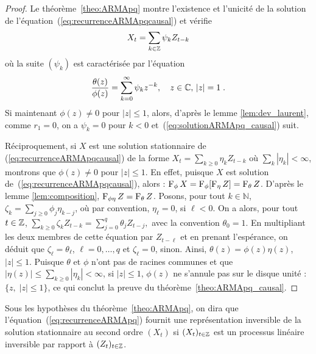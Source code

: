 \begin{proof}\smartqed
Le th\'eor\`eme~\ref{theo:ARMApq} montre l'existence et l'unicit\'e
de la solution de l'\'equation~(\ref{eq:recurrenceARMApqcausal}) et v\'erifie
\begin{equation*}
  X_t = \sum_{k\in\mathbb{Z}} \psi_k Z_{t-k}
\end{equation*}
o\`u la suite $(\psi_k)$ est caract\'eris\'ee par l'\'equation
$$
\frac{\theta(z)}{\phi(z)}=\sum_{k=0}^{\infty} \psi_k z^{-k},\quad z\in\mathbb{C},\,|z|=1\;.
$$
Si maintenant $\phi(z)\neq 0$ pour $|z|\leq 1$, alors, d'apr\`es le
 lemme \ref{lem:dev_laurent}, comme $r_1=0$, on a $\psi_k=0$ pour $k<0$
 et~(\ref{eq:solutionARMApq_causal}) suit.


R\'eciproquement, si $X$ est une solution stationnaire de
(\ref{eq:recurrenceARMApqcausal}) de la forme $X_t=\sum_{k\geq 0}\eta_k
Z_{t-k}$ o\`u $\sum_k |\eta_k|<\infty$, montrons que $\phi(z)\neq 0$ pour
$|z|\leq 1$. En effet, puisque $X$ est solution
de~(\ref{eq:recurrenceARMApqcausal}), alors : $\operatorname{F}_{\phi}
X=\operatorname{F}_{\phi}[\operatorname{F}_{\eta} Z]=\operatorname{F}_{\theta} Z$. D'apr\`es le lemme
\ref{lem:composition}, $\operatorname{F}_{\phi\eta}Z=\operatorname{F}_{\theta} Z$. Posons, pour
tout $k\in\mathbb{N}$, $\zeta_k=\sum_{j\geq 0}\phi_j \eta_{k-j}$, o\`u par
convention, $\eta_\ell=0$, si $\ell<0$.  On a alors, pour tout $t\in\mathbb{Z}$,
$\sum_{k\geq 0}\zeta_k Z_{t-k}=\sum_{j=0}^q\theta_j Z_{t-j},$ avec la
convention $\theta_0=1$.  En multipliant les deux membres de cette \'equation par
$Z_{t-\ell}$ et en prenant l'esp\'erance, on d\'eduit que $\zeta_\ell=\theta_\ell$,
$\ell=0,\dots,q$ et $\zeta_\ell=0$, sinon. Ainsi, $\theta(z)=\phi(z)\eta(z)$,
$|z|\leq 1$. Puisque $\theta$ et $\phi$ n'ont pas de racines communes et que
$|\eta(z)|\leq\sum_{k\geq 0}|\eta_k|<\infty$, si $|z|\leq 1$, $\phi(z)$ ne
s'annule pas sur le disque unit\'e : $\{z,\; |z|\leq 1\}$, ce qui conclut la
preuve du th\'eor\`eme~\ref{theo:ARMApq_causal}.

\end{proof}


\begin{definition}
  Sous les hypoth\`eses du th\'eor\`eme~\ref{theo:ARMApq}, on dira que
  l'\'equation~(\ref{eq:recurrenceARMApq}) fournit une repr\'esentation inversible
  de la solution stationnaire au second ordre $(X_t)$ si $(X_t)_{t\in\mathbb{Z}}$
  est un processus lin\'eaire inversible par rapport \`a $(Z_t)_{t\in\mathbb{Z}}$.
\end{definition}

